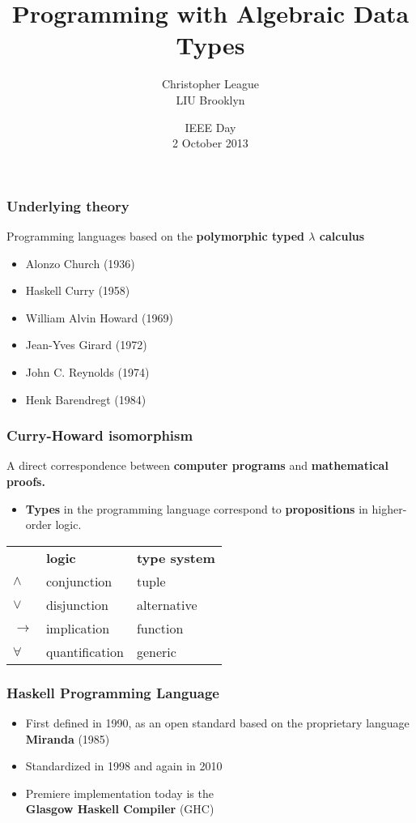 \documentclass[14pt,t,usepdftitle=false,
xcolornames=x11names,svgnames,dvipsnames]{beamer}
\newcommand{\wackyFont}[1]{
  {\LARGE\fontspec[Mapping=tex-text]{Immi Five O Five Std} #1}}
\newcommand{\subtitleFont}[1]{{\footnotesize #1}}
\begin{document}
\title{\wackyFont{Programming with Algebraic Data Types}}
\author{Christopher League\\\subtitleFont{LIU Brooklyn}}
\date{\subtitleFont{IEEE Day\\2 October 2013}}
\maketitle

\begin{frame}
  \frametitle{Underlying theory}
  Programming languages based on the 
  \textbf{polymorphic typed $\lambda$ calculus}
  \begin{itemize}
  \item Alonzo Church (1936)
  \item Haskell Curry (1958)
  \item William Alvin Howard (1969)
  \item Jean-Yves Girard (1972)
  \item John C. Reynolds (1974)
  \item Henk Barendregt (1984)
  \end{itemize}
\end{frame}

\begin{frame}
  \frametitle{Curry-Howard isomorphism}
  A direct correspondence between \textbf{computer programs} and
  \textbf{mathematical proofs.}
  \begin{itemize}
  \item \textbf{Types} in the programming language correspond to
    \textbf{propositions} in higher-order logic.
  \end{itemize}
  \begin{center}
      \begin{tabular}{lll}
        &\bf logic&\bf type system\\
        $\wedge$ & conjunction & tuple\\
        $\vee$& disjunction & alternative\\
        $\rightarrow$& implication & function\\
        $\forall$&quantification& generic\\
      \end{tabular}
    \end{center}
\end{frame}

\begin{frame}
  \frametitle{Haskell Programming Language}
  \begin{itemize}
  \item First defined in 1990, as an open standard based on the
    proprietary language \textbf{Miranda} (1985)
  \item Standardized in 1998 and again in 2010
  \item Premiere implementation today is the\\\textbf{Glasgow Haskell
      Compiler} (GHC)
  \end{itemize}
\end{frame}
\end{document}

